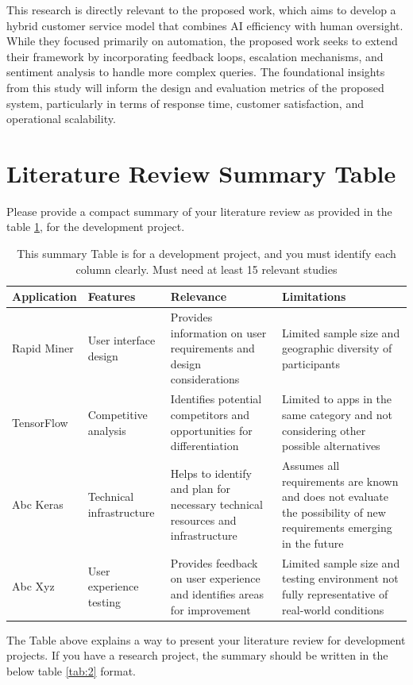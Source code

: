 This research is directly relevant to the proposed work, which aims to develop a hybrid customer service model that combines AI efficiency with human oversight. While they focused primarily on automation, the proposed work seeks to extend their framework by incorporating feedback loops, escalation mechanisms, and sentiment analysis to handle more complex queries. The foundational insights from this study will inform the design and evaluation metrics of the proposed system, particularly in terms of response time, customer satisfaction, and operational scalability.

\section{Literature Review Summary Table}
Please provide a compact summary of your literature review as provided in the table \ref{tab:1}, for the development project.
\begin{table}[!h]
\centering
\caption{This summary Table is for a development project, and you must identify each column clearly. Must need at least 15 relevant studies}
\begin{tabular}{|p{2.5cm}|p{2.5cm}|p{4cm}|p{5cm}|}
\hline
    \textbf{Application} & \textbf{Features} & \textbf{Relevance} & \textbf{Limitations} \\
\hline
Rapid Miner \cite{ref:Duda:2000} & User interface design & Provides information on user requirements and design considerations & Limited sample size and geographic diversity of participants \\
\hline
TensorFlow \cite{ref:SVMGuide} & Competitive analysis & Identifies potential competitors and opportunities for differentiation & Limited to apps in the same category and not considering other possible alternatives \\
\hline
Abc Keras \cite{ref:guyon:2007} & Technical infrastructure & Helps to identify and plan for necessary technical resources and infrastructure & Assumes all requirements are known and does not evaluate the possibility of new requirements emerging in the future \\
\hline
Abc Xyz \cite{ref:guyon:2007a} & User experience testing & Provides feedback on user experience and identifies areas for improvement & Limited sample size and testing environment not fully representative of real-world conditions \\
\hline
\end{tabular}
\label{tab:1}
\end{table}
The Table above explains a way to present your literature review for development projects. If you have a research project, the summary should be written in the below table \ref{tab:2} format.
